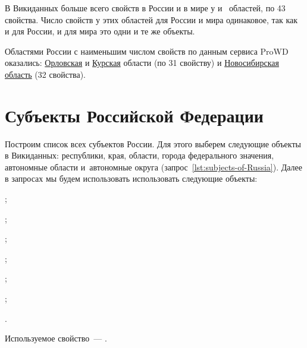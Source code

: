 \newpage
В Викиданных больше всего свойств в России и в мире у  
и~ областей, по 43 свойства\autocite{Russia_prowd}. 
Число свойств у этих областей для России и мира одинаковое, так как и для России, и для мира это одни и те же объекты.

Областями России с наименьшим числом свойств по данным сервиса ProWD оказались: 
\href{http://www.wikidata.org/entity/Q3129}{Орловская} и \href{http://www.wikidata.org/entity/Q3178}{Курская} области (по 31 свойству) и \href{http://www.wikidata.org/entity/Q5851}{Новосибирская область} (32 свойства).




\section{Субъекты Российской Федерации}

Построим список всех субъектов России. 
Для этого выберем следующие объекты в Викиданных: 
республики, края, области, города федерального значения, автономные области и~автономные округа (запрос~\ref{lst:subjects-of-Russia}). 
Далее в запросах мы будем использовать использовать следующие объекты:
\begin{compactitemize}
	\item{};
	\item{};
	\item{};
	\item{};
	\item{};
	\item{};
	\item{}.
\end{compactitemize}
Используемое свойство~--- .

